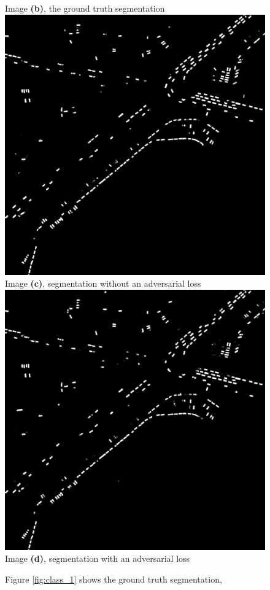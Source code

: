 \documentclass{kththesis}
\begin{document}
\begin{figure}[H]
  Image \textbf{(b)}, the ground truth segmentation
\endminipage\hfill
{}
  \includegraphics[width=\linewidth]{gan_vs_class/class_4}
  Image \textbf{(c)}, segmentation without an adversarial loss
\endminipage\hfill
{}%
  \includegraphics[width=\linewidth]{gan_vs_class/gan_4}
   Image \textbf{(d)}, segmentation with an adversarial loss
\endminipage
\caption{Figure \ref{fig:class_1} shows the ground truth segmentation,}
\end{figure}
\end{document}
